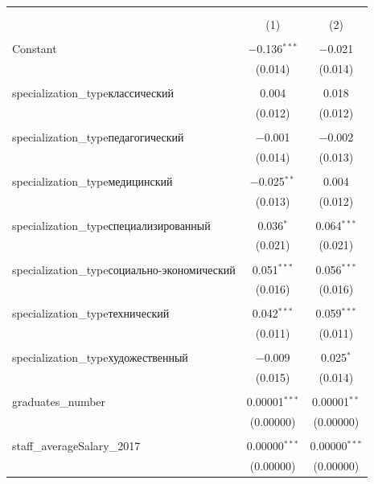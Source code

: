 \documentclass[alpha-refs]{wiley-article-05g}
\begin{document}
\begin{table}[!htbp] \centering 
	\caption{} 
	\label{} 
	\begin{tabular}{@{\extracolsep{5pt}}lcc} 
		\\[-1.8ex]\hline 
		\hline \\[-1.8ex] 
		\\[-1.8ex] & (1) & (2)\\ 
		\hline \\[-1.8ex] 
		Constant & $-$0.136$^{***}$ & $-$0.021 \\ 
		& (0.014) & (0.014) \\ 
		& & \\ 
		specialization\_typeклассический & 0.004 & 0.018 \\ 
		& (0.012) & (0.012) \\ 
		& & \\ 
		specialization\_typeпедагогический & $-$0.001 & $-$0.002 \\ 
		& (0.014) & (0.013) \\ 
		& & \\ 
		specialization\_typeмедицинский & $-$0.025$^{**}$ & 0.004 \\ 
		& (0.013) & (0.012) \\ 
		& & \\ 
		specialization\_typeспециализированный & 0.036$^{*}$ & 0.064$^{***}$ \\ 
		& (0.021) & (0.021) \\ 
		& & \\ 
		specialization\_typeсоциально-экономический & 0.051$^{***}$ & 0.056$^{***}$ \\ 
		& (0.016) & (0.016) \\ 
		& & \\ 
		specialization\_typeтехнический & 0.042$^{***}$ & 0.059$^{***}$ \\ 
		& (0.011) & (0.011) \\ 
		& & \\ 
		specialization\_typeхудожественный & $-$0.009 & 0.025$^{*}$ \\ 
		& (0.015) & (0.014) \\ 
		& & \\ 
		graduates\_number & 0.00001$^{***}$ & 0.00001$^{**}$ \\ 
		& (0.00000) & (0.00000) \\ 
		& & \\ 
		staff\_averageSalary\_2017 & 0.00000$^{***}$ & 0.00000$^{***}$ \\ 
		& (0.00000) & (0.00000) \\ 

\end{tabular}
\end{table}
\end{document}
